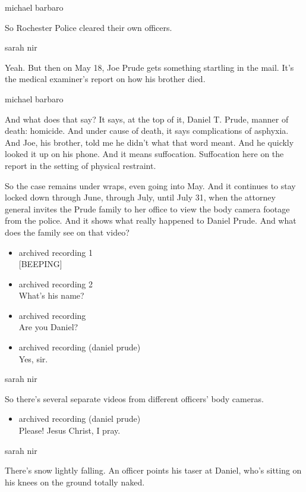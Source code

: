 michael barbaro

So Rochester Police cleared their own officers.

sarah nir

Yeah. But then on May 18, Joe Prude gets something startling in the
mail. It's the medical examiner's report on how his brother died.

michael barbaro

And what does that say? It says, at the top of it, Daniel T. Prude,
manner of death: homicide. And under cause of death, it says
complications of asphyxia. And Joe, his brother, told me he didn't what
that word meant. And he quickly looked it up on his phone. And it means
suffocation. Suffocation here on the report in the setting of physical
restraint.

So the case remains under wraps, even going into May. And it continues
to stay locked down through June, through July, until July 31, when the
attorney general invites the Prude family to her office to view the body
camera footage from the police. And it shows what really happened to
Daniel Prude. And what does the family see on that video?

\begin{itemize}
\item
  archived recording 1\\
  {[}BEEPING{]}
\item
  archived recording 2\\
  What's his name?
\item
  archived recording\\
  Are you Daniel?
\item
  archived recording (daniel prude)\\
  Yes, sir.
\end{itemize}

sarah nir

So there's several separate videos from different officers' body
cameras.

\begin{itemize}
\tightlist
\item
  archived recording (daniel prude)\\
  Please! Jesus Christ, I pray.
\end{itemize}

sarah nir

There's snow lightly falling. An officer points his taser at Daniel,
who's sitting on his knees on the ground totally naked.


